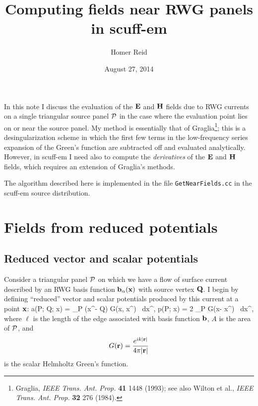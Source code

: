 \documentclass[letterpaper]{article}
\title {Computing fields near RWG panels in {\sc scuff-em}}
\author {Homer Reid}
\date {August 27, 2014}
\begin{document}
\pagestyle{myheadings}
\maketitle

In this note I discuss the evaluation of the
$\mathbf{E}$ and $\mathbf{H}$ fields due to RWG currents
on a single triangular source panel $\mathcal{P}$ in the case 
where the evaluation point lies on or near the source 
panel.
My method is essentially that of
Graglia\footnote{Graglia, \textit{IEEE Trans. Ant. Prop.} 
\textbf{41} 1448 (1993); see also 
Wilton et al., \textit{IEEE Trans. Ant. Prop.} \textbf{32} 
276 (1984).}; this is a desingularization scheme in which  
the first few terms in the low-frequency series expansion of the 
Green's function are subtracted off and evaluated analytically.
However, in {\sc scuff-em} I need also to compute the 
\textit{derivatives} of the $\mathbf{E}$ and $\mathbf{H}$ fields,
which requires an extension of Graglia's methods.

The algorithm described here is implemented in the 
file \texttt{GetNearFields.cc} in the {\sc scuff-em} source
distribution. 

\tableofcontents

\newpage
\section{Fields from reduced potentials} 

\subsection{Reduced vector and scalar potentials}

Consider a triangular panel $\mathcal{P}$ on which we have a flow of 
surface current described by an RWG basis function
$\mathbf{b}_\alpha(\mathbf{x})$ with source vertex $\mathbf{Q}$. I begin by
defining ``reduced'' vector and scalar potentials produced by this 
current at a point $\mathbf{x}$:
{ \vb a(\mc P; \vb Q; \vb x) = 
   \int_{\mc P} (\vb x^\prime - \vb Q) G(\vb x, \vb x^\prime) \, d\vb x^\prime,
   \qquad
   p(\mc P; \vb x) = 2\cdot{}
   \int_{\mc P} G(\vb x- \vb x^\prime) \, d\vb x^\prime,
}
where $\ell$ is the length of the edge associated with basis function
$\mathbf{b}$, $A$ is the area of $\mathcal{P}$, and
$$ G(\mathbf{r})=\frac{e^{ik|\mathbf{r}|}}{4\pi |\mathbf{r}|} $$
is the scalar Helmholtz Green's function.
\end{document}
